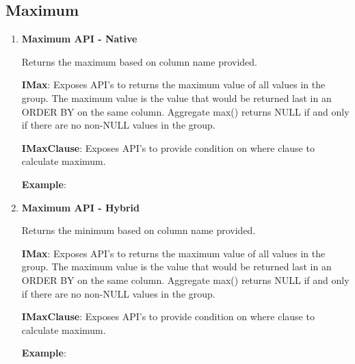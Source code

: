 	\subsection{Maximum} 
		
		\begin{enumerate}
		
			\item \small \textbf{Maximum API - Native}
				\par 
				Returns the maximum based on column name provided.
					
		
				\textbf{IMax}:    Exposes API's to returns the maximum value of all values in the group.
						The maximum value is the value that would be returned last in an ORDER BY on the same column. 
						Aggregate max() returns NULL if and only if there are no non-NULL values in the group.


					

			
				\textbf{IMaxClause}: Exposes API's to provide condition on where clause to calculate maximum.
					

				\textbf{Example}: 
					


			\item \small \textbf{Maximum API - Hybrid}
				\par 
				Returns the minimum based on column name provided.
					
		
				\textbf{IMax}:    Exposes API's to returns the maximum value of all values in the group.
						The maximum value is the value that would be returned last in an ORDER BY on the same column. 
						Aggregate max() returns NULL if and only if there are no non-NULL values in the group.


					

			
				\textbf{IMaxClause}: Exposes API's to provide condition on where clause to calculate maximum.
					

				\textbf{Example}: 
					

		\end{enumerate}



